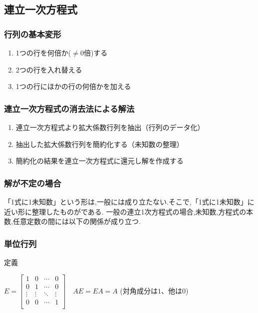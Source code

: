 \documentclass[a4paper]{jsarticle}
\begin{document}
\subsection{連立一次方程式}
\subsubsection{行列の基本変形}
\begin{enumerate}[(1)]
    \item 1つの行を何倍か($\neq0$倍)する
    \item 2つの行を入れ替える
    \item 1つの行にほかの行の何倍かを加える
\end{enumerate}
\subsubsection{連立一次方程式の消去法による解法}
\begin{enumerate}[(1)]
    \item 連立一次方程式より拡大係数行列を抽出（行列のデータ化）
    \item 抽出した拡大係数行列を簡約化する（未知数の整理）
    \item 簡約化の結果を連立一次方程式に還元し解を作成する
\end{enumerate}
\subsubsection{解が不定の場合}
「1式に1未知数」という形は,一般には成り立たない.そこで,「1式に1未知数」に近い形に整理したものがである.
一般の連立1次方程式の場合,未知数,方程式の本数,任意定数の間には以下の関係が成り立つ.
\begin{center}
\end{center}
\subsubsection{単位行列}
\begin{itembox}[l]{定義}
    \begin{center}
        $E=
            \begin{bmatrix}
                1      & 0      & \cdots & 0      \\
                0      & 1      & \cdots & 0      \\
                \vdots & \vdots & \ddots & \vdots \\
                0      & 0      & \cdots & 1      \\
            \end{bmatrix}
            \quad AE=EA=A
        $
        \quad(対角成分は$1$、他は$0$)
    \end{center}
\end{itembox}
\end{document}
